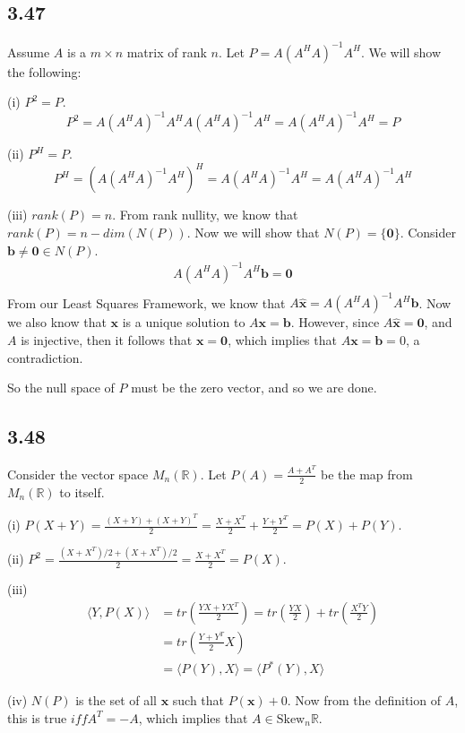 \documentclass{article}
\newcommand{\inprod}[1]{\langle #1 \rangle}
\begin{document}
	\subsection*{3.47}
	Assume $A$ is a $m \times n$ matrix of rank $n$. Let $P = A(A^H A)^{-1} A^H$. We will show the following: 
	
	(i) $P^2 = P$.
	\[ P^2 = A(A^H A)^{-1} A^H A (A^H A)^{-1} A^H = A(A^H A)^{-1} A^H = P \]
	
	(ii) $P^H = P$. 
	\[ P^H = (A (A^H A)^{-1} A^H)^H = A (A^H A)^{-1} A^H = A(A^HA)^{-1} A^H \]
	
	(iii) $rank(P) = n$.
	From rank nullity, we know that $rank(P) = n - dim(N(P))$. Now we will show that $N(P) = \{ \mathbf{0} \}$. Consider $\mathbf{b}  \neq \mathbf{0} \in N(P)$. 
	\begin{align*}
	A(A^HA)^{-1}A^H \mathbf{b} = \mathbf{0} \\
	\end{align*} 
	From our Least Squares Framework, we know that $A \hat{\mathbf{x}} = A(A^H A)^{-1} A^H \mathbf{b}$. Now we also know that $\mathbf{\mathbf{x}}$ is a unique solution to $ A \mathbf{x} = \mathbf{b}$. However, since $A \hat{\mathbf{x}} = \mathbf{0}$, and $A$ is injective, then it follows that $\mathbf{x} = \mathbf{0}$, which implies that $A \mathbf{x} = \mathbf{b} = 0$, a contradiction.
	
	So the null space of $P$ must be the zero vector, and so we are done.
	
	\subsection*{3.48}
	Consider the vector space $M_n(\mathbb{R})$. Let $P(A) = \frac{A + A^T}{2}$ be the map from $M_n(\mathbb{R})$ to itself. 
	
	(i) $P(X+Y) = \frac{(X+Y) + (X+Y)^T}{2} = \frac{X + X^T}{2} + \frac{Y + Y^T}{2} = P(X) + P(Y)$. 
	
	(ii) $P^2 = \frac{(X+X^T)/2 + (X + X^T)/2}{2} = \frac{X + X^T}{2} = P(X)$.
	
	(iii) 
	\begin{align*}
	\inprod{Y, P(X)} &= tr(\frac{YX+ YX^T}{2}) = tr(\frac{YX}{2}) + tr(\frac{X^TY}{2}) \\
	&=tr( \frac{Y+ Y^T}{2} X) \\
	&= \inprod{P(Y),X} = \inprod{P^*(Y), X}
	\end{align*}
	
	(iv) $N(P)$ is the set of all $\mathbf{x}$ such that $P(\mathbf{x}) + 0$. Now from the definition of $A$, this is true $iff A^T = -A$, which implies that $A \in \text{Skew}_n \mathbb{R}$. 
	
\end{document}
